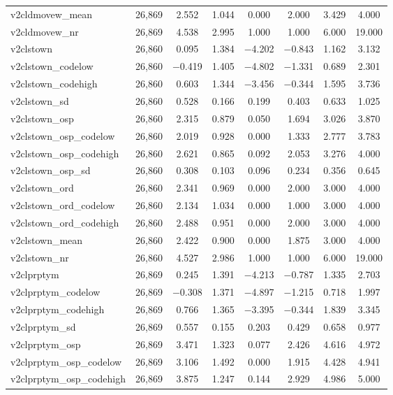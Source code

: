 \begin{table}[!htbp]
\begin{tabular}{@{\extracolsep{5pt}}lccccccc}
v2cldmovew\_mean & 26,869 & 2.552 & 1.044 & 0.000 & 2.000 & 3.429 & 4.000 \\ 
v2cldmovew\_nr & 26,869 & 4.538 & 2.995 & 1.000 & 1.000 & 6.000 & 19.000 \\ 
v2clstown & 26,860 & 0.095 & 1.384 & $-$4.202 & $-$0.843 & 1.162 & 3.132 \\ 
v2clstown\_codelow & 26,860 & $-$0.419 & 1.405 & $-$4.802 & $-$1.331 & 0.689 & 2.301 \\ 
v2clstown\_codehigh & 26,860 & 0.603 & 1.344 & $-$3.456 & $-$0.344 & 1.595 & 3.736 \\ 
v2clstown\_sd & 26,860 & 0.528 & 0.166 & 0.199 & 0.403 & 0.633 & 1.025 \\ 
v2clstown\_osp & 26,860 & 2.315 & 0.879 & 0.050 & 1.694 & 3.026 & 3.870 \\ 
v2clstown\_osp\_codelow & 26,860 & 2.019 & 0.928 & 0.000 & 1.333 & 2.777 & 3.783 \\ 
v2clstown\_osp\_codehigh & 26,860 & 2.621 & 0.865 & 0.092 & 2.053 & 3.276 & 4.000 \\ 
v2clstown\_osp\_sd & 26,860 & 0.308 & 0.103 & 0.096 & 0.234 & 0.356 & 0.645 \\ 
v2clstown\_ord & 26,860 & 2.341 & 0.969 & 0.000 & 2.000 & 3.000 & 4.000 \\ 
v2clstown\_ord\_codelow & 26,860 & 2.134 & 1.034 & 0.000 & 1.000 & 3.000 & 4.000 \\ 
v2clstown\_ord\_codehigh & 26,860 & 2.488 & 0.951 & 0.000 & 2.000 & 3.000 & 4.000 \\ 
v2clstown\_mean & 26,860 & 2.422 & 0.900 & 0.000 & 1.875 & 3.000 & 4.000 \\ 
v2clstown\_nr & 26,860 & 4.527 & 2.986 & 1.000 & 1.000 & 6.000 & 19.000 \\ 
v2clprptym & 26,869 & 0.245 & 1.391 & $-$4.213 & $-$0.787 & 1.335 & 2.703 \\ 
v2clprptym\_codelow & 26,869 & $-$0.308 & 1.371 & $-$4.897 & $-$1.215 & 0.718 & 1.997 \\ 
v2clprptym\_codehigh & 26,869 & 0.766 & 1.365 & $-$3.395 & $-$0.344 & 1.839 & 3.345 \\ 
v2clprptym\_sd & 26,869 & 0.557 & 0.155 & 0.203 & 0.429 & 0.658 & 0.977 \\ 
v2clprptym\_osp & 26,869 & 3.471 & 1.323 & 0.077 & 2.426 & 4.616 & 4.972 \\ 
v2clprptym\_osp\_codelow & 26,869 & 3.106 & 1.492 & 0.000 & 1.915 & 4.428 & 4.941 \\ 
v2clprptym\_osp\_codehigh & 26,869 & 3.875 & 1.247 & 0.144 & 2.929 & 4.986 & 5.000 \\ 

\end{tabular}
\end{table}
